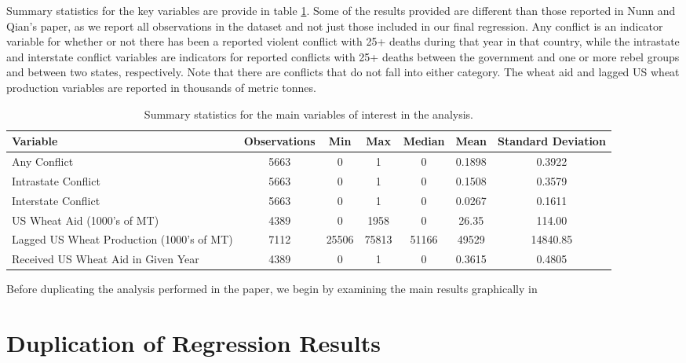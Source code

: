 \documentclass{article}
\begin{document}
Summary statistics for the key variables are provide in table \ref{summary}. Some of the results provided are different than those reported in Nunn and Qian's paper, as we report all observations in the dataset and not just those included in our final regression. Any conflict is an indicator variable for whether or not there has been a reported violent conflict with 25+ deaths during that year in that country, while the intrastate and interstate conflict variables are indicators for reported conflicts with 25+ deaths between the government and one or more rebel groups and between two states, respectively. Note that there are conflicts that do not fall into either category. The wheat aid and lagged US wheat production variables are reported in thousands of metric tonnes. 
\begin{table}[t]
\centering
\begin{tabular}{| l | c | c | c | c | c | c | }
\hline
Variable & Observations & Min & Max & Median & Mean & Standard Deviation\\
\hline
Any Conflict & 5663 & 0 & 1 & 0 & 0.1898 & 0.3922 \\
Intrastate Conflict & 5663 & 0 & 1 & 0 & 0.1508 & 0.3579\\
Interstate Conflict & 5663 & 0 & 1 & 0 & 0.0267 & 0.1611\\
\hline
US Wheat Aid (1000's of MT) & 4389 & 0 & 1958 & 0 & 26.35 & 114.00\\
Lagged US Wheat Production (1000's of MT) & 7112 & 25506 & 75813   & 51166 & 49529 & 14840.85\\
Received US Wheat Aid in Given Year &4389 &  0 & 1 & 0 & 0.3615 & 0.4805\\
\hline 
\end{tabular}
\label{summary}
\caption{Summary statistics for the main variables of interest in the analysis. }
\end{table}

Before duplicating the analysis performed in the paper, we begin by examining the main results graphically in 

\begin{figure}
\label{}
\end{figure}
 
\section{Duplication of Regression Results}
\end{document}
